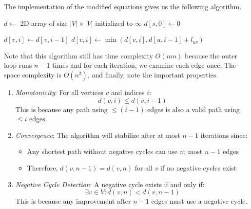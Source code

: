 \documentclass{article}
\begin{document}
    \begin{algo}
      The implementation of the modified equations gives us the following algorithm. 
      \begin{algorithm}[H]
        \label{alg:bellman_ford_leq}
        \begin{algorithmic}[1]
          \State $d \gets$ 2D array of size $|V| \times |V|$ initialized to $\infty$
          \State $d[s,0] \gets 0$ 
          
              \State $d[v,i] \gets d[v,i-1]$ 
                \State $d[v,i] \gets \min(d[v,i], d[u,i-1] + l_{uv})$
              \EndFor
            \EndFor
          \EndFor
        \end{algorithmic}
      \end{algorithm}
      Note that this algorithm still has time complexity $O(nm)$ because the outer loop runs $n-1$ times and for each iteration, we examine each edge once. The space complexity is $O(n^2)$, and finally, note the important properties. 
      \begin{enumerate}
        \item \textit{Monotonicity}: For all vertices $v$ and indices $i$:
        \begin{equation}
          d(v,i) \leq d(v,i-1)
        \end{equation}
        This is because any path using $\leq (i-1)$ edges is also a valid path using $\leq i$ edges.

        \item \textit{Convergence}: The algorithm will stabilize after at most $n-1$ iterations since:
        \begin{itemize}
          \item Any shortest path without negative cycles can use at most $n-1$ edges
          \item Therefore, $d(v,n-1) = d(v,n)$ for all $v$ if no negative cycles exist
        \end{itemize}

        \item \textit{Negative Cycle Detection}: A negative cycle exists if and only if:
        \begin{equation}
          \exists v \in V : d(v,n) < d(v,n-1)
        \end{equation}
        This is because any improvement after $n-1$ edges must use a negative cycle.
      \end{enumerate}
    \end{algo}
\end{document}
